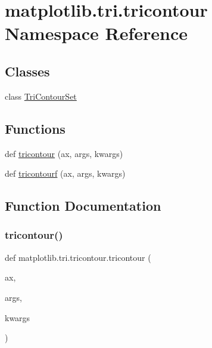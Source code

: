 \hypertarget{namespacematplotlib_1_1tri_1_1tricontour}{}\section{matplotlib.\+tri.\+tricontour Namespace Reference}
\label{namespacematplotlib_1_1tri_1_1tricontour}
\subsection*{Classes}
\begin{DoxyCompactItemize}
\item 
class \hyperlink{classmatplotlib_1_1tri_1_1tricontour_1_1TriContourSet}{Tri\+Contour\+Set}
\end{DoxyCompactItemize}
\subsection*{Functions}
\begin{DoxyCompactItemize}
\item 
def \hyperlink{namespacematplotlib_1_1tri_1_1tricontour_a53a68f2f6418caa5421c57baaf543d60}{tricontour} (ax, args, kwargs)
\item 
def \hyperlink{namespacematplotlib_1_1tri_1_1tricontour_ae66e57ea407e6786886bb7b0da9f8af1}{tricontourf} (ax, args, kwargs)
\end{DoxyCompactItemize}


\subsection{Function Documentation}
\mbox{\label{namespacematplotlib_1_1tri_1_1tricontour_a53a68f2f6418caa5421c57baaf543d60}} 
\subsubsection{\texorpdfstring{tricontour()}{tricontour()}}
{\footnotesize\ttfamily def matplotlib.\+tri.\+tricontour.\+tricontour (\begin{DoxyParamCaption}\item[{}]{ax,  }\item[{}]{args,  }\item[{}]{kwargs }\end{DoxyParamCaption})}

